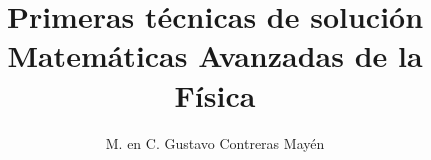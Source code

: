 
\usepackage{standalone}
\usepackage{tikz-3dplot}

\title{Primeras técnicas de solución \\[0.3em]  \large{Matemáticas Avanzadas de la Física}\vspace{-3ex}}
\author{M. en C. Gustavo Contreras Mayén}
\date{ }


\vspace{-4cm}
\maketitle
\fontsize{14}{14}\selectfont
\tableofcontents
\newpage







